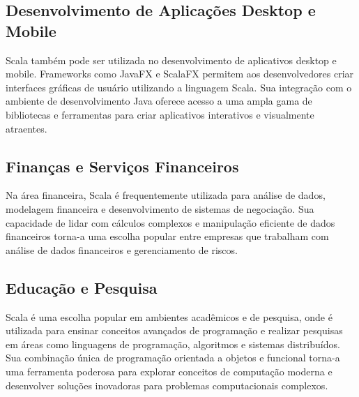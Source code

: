 \subsection{Desenvolvimento de Aplicações Desktop e Mobile}

Scala também pode ser utilizada no desenvolvimento de aplicativos desktop e mobile. Frameworks como JavaFX e ScalaFX permitem aos desenvolvedores criar interfaces gráficas de usuário utilizando a linguagem Scala. Sua integração com o ambiente de desenvolvimento Java oferece acesso a uma ampla gama de bibliotecas e ferramentas para criar aplicativos interativos e visualmente atraentes.

\subsection{Finanças e Serviços Financeiros}

Na área financeira, Scala é frequentemente utilizada para análise de dados, modelagem financeira e desenvolvimento de sistemas de negociação. Sua capacidade de lidar com cálculos complexos e manipulação eficiente de dados financeiros torna-a uma escolha popular entre empresas que trabalham com análise de dados financeiros e gerenciamento de riscos.

\subsection{Educação e Pesquisa}

Scala é uma escolha popular em ambientes acadêmicos e de pesquisa, onde é utilizada para ensinar conceitos avançados de programação e realizar pesquisas em áreas como linguagens de programação, algoritmos e sistemas distribuídos. Sua combinação única de programação orientada a objetos e funcional torna-a uma ferramenta poderosa para explorar conceitos de computação moderna e desenvolver soluções inovadoras para problemas computacionais complexos.



